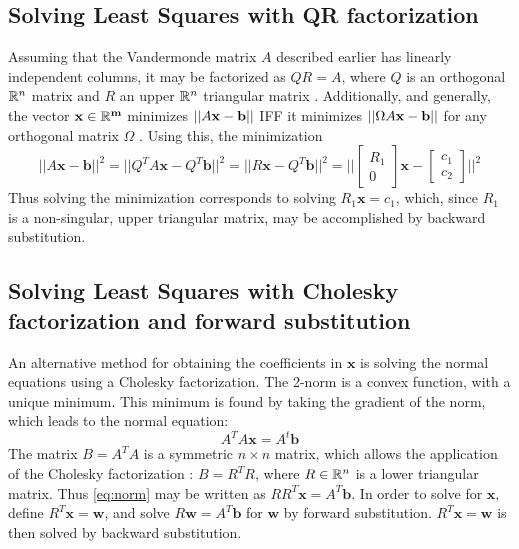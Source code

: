 \documentclass[%
oneside,                 %
final,                   %
10pt]{article}
\begin{document}
\subsection{Solving Least Squares with QR factorization}
Assuming that the Vandermonde matrix $A$ described earlier has linearly independent columns, it may be factorized as $QR=A$, where $Q$ is an orthogonal ${\Bbb R}^n$ matrix and $R$ an  upper ${\Bbb R}^n$ triangular matrix \cite{MF3}. Additionally, and generally, the  vector $\bf x \in {\Bbb R}^m$ minimizes $||A\bf x - \bf b||$ IFF it minimizes $||\Omega A \bf x - \bf b||$ for any orthogonal  matrix $\Omega$ \cite{MF4}. Using this, the minimization
\begin{equation}
||A\mathbf{x} - \mathbf{b} ||^2 = ||Q^TA\mathbf{x}-Q^T\mathbf{b}||^2=||R\mathbf{x}-Q^T\mathbf{b}||^2=||\begin{bmatrix} R_1 \\ 0 \end{bmatrix} \mathbf{x}-\begin{bmatrix} c_1 \\ c_2 \end{bmatrix}||^2
\end{equation} 
Thus solving the minimization corresponds to solving $R_1 \mathbf{x} = c_1$, which, since $R_1$ is a non-singular, upper triangular matrix, may be accomplished by backward substitution.

\subsection{Solving Least Squares with Cholesky factorization and forward substitution}
An alternative method for obtaining the coefficients in $\mathbf{x}$ is solving the normal equations using a Cholesky factorization. The 2-norm is a convex function, with a unique minimum. This minimum is found by taking the gradient of the norm, which leads to the normal equation:
\begin{equation}
A^TA\mathbf{x}=A^t\mathbf{b}
\label{eq:norm}
\end{equation}
The matrix $B=A^TA$ is a symmetric $n\times n$ matrix, which allows the application of the Cholesky factorization \cite{MF3}: $B=R^TR$, where $R \in {\Bbb R}^n$ is a lower triangular matrix. Thus \eqref{eq:norm} may be written as $RR^T\mathbf{x}=A^T\mathbf{b}$. In order to solve for $\mathbf{x}$, define $R^T \mathbf{x}=\mathbf{w}$, and solve $R\mathbf{w}=A^T\mathbf{b}$ for $\mathbf{w}$ by forward substitution. $R^T \mathbf{x}=\mathbf{w}$ is then solved  by backward substitution.
 
\end{document}
